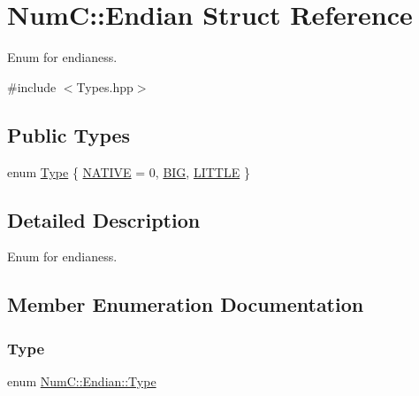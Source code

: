 \hypertarget{struct_num_c_1_1_endian}{}\section{NumC\+:\+:Endian Struct Reference}
\label{struct_num_c_1_1_endian}


Enum for endianess.  




{\ttfamily \#include $<$Types.\+hpp$>$}

\subsection*{Public Types}
\begin{DoxyCompactItemize}
\item 
enum \mbox{\hyperlink{struct_num_c_1_1_endian_ab667001489f67f8a96f328f0a9c351fa}{Type}} \{ \mbox{\hyperlink{struct_num_c_1_1_endian_ab667001489f67f8a96f328f0a9c351faa2a005e0131df4be2a90ba50ab355cef0}{N\+A\+T\+I\+VE}} = 0, 
\mbox{\hyperlink{struct_num_c_1_1_endian_ab667001489f67f8a96f328f0a9c351faad422b7ebfcca12181e9f716967c8f297}{B\+IG}}, 
\mbox{\hyperlink{struct_num_c_1_1_endian_ab667001489f67f8a96f328f0a9c351faa3020768f019d9f31eaf482d6e750d727}{L\+I\+T\+T\+LE}}
 \}
\end{DoxyCompactItemize}


\subsection{Detailed Description}
Enum for endianess. 

\subsection{Member Enumeration Documentation}
\mbox{\label{struct_num_c_1_1_endian_ab667001489f67f8a96f328f0a9c351fa}} 
\subsubsection{\texorpdfstring{Type}{Type}}
{\footnotesize\ttfamily enum \mbox{\hyperlink{struct_num_c_1_1_endian_ab667001489f67f8a96f328f0a9c351fa}{Num\+C\+::\+Endian\+::\+Type}}}

